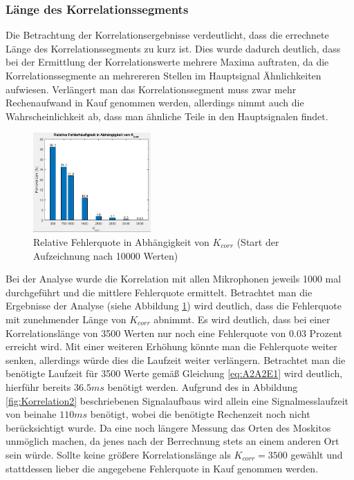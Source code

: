 \subsubsection{Länge des Korrelationssegments}

Die Betrachtung der Korrelationsergebnisse verdeutlicht, dass die errechnete Länge des Korrelationssegments zu kurz ist. Dies wurde dadurch deutlich, dass bei der Ermittlung der Korrelationswerte mehrere Maxima auftraten, da die Korrelationssegmente an mehrereren Stellen im Hauptsignal Ähnlichkeiten aufwiesen. Verlängert man das Korrelationssegment muss zwar mehr Rechenaufwand in Kauf genommen werden, allerdings nimmt auch die Wahrscheinlichkeit ab, dass man ähnliche Teile in den Hauptsignalen findet.\\


\begin{figure}
\centering 
\includegraphics[width=0.4\textwidth]{KorrelationsAnalyse1}
\caption{Relative Fehlerquote in Abhängigkeit von $K_{corr}$  \linebreak(Start der Aufzeichnung nach 10000 Werten)} \label{fig:KorrelationAnalyse1}
\end{figure}

Bei der Analyse wurde die Korrelation mit allen Mikrophonen jeweils 1000 mal durchgeführt und die mittlere Fehlerquote ermittelt. Betrachtet man die Ergebnisse der Analyse (siehe Abbildung \ref{fig:KorrelationAnalyse1}) wird deutlich, dass die Fehlerquote mit zunehmender Länge von $K_{corr}$ abnimmt. Es wird deutlich, dass bei einer Korrelationslänge von 3500 Werten nur noch eine Fehlerquote von $0.03$  Prozent  erreicht wird. Mit einer weiteren Erhöhung könnte man die Fehlerquote weiter senken, allerdings würde dies die Laufzeit weiter verlängern. Betrachtet man die benötigte Laufzeit für 3500 Werte gemäß Gleichung \ref{eq:A2A2E1} wird deutlich, hierführ bereits $36.5ms$ benötigt werden.
Aufgrund des in Abbildung \ref{fig:Korrelation2} beschriebenen Signalaufbaus wird allein eine Signalmesslaufzeit von beinahe $110ms$ benötigt, wobei die benötigte Rechenzeit noch nicht berücksichtigt wurde.
Da eine noch längere Messung das Orten des Moskitos unmöglich machen, da jenes nach der Berrechnung stets an einem anderen Ort sein würde. Sollte keine größere Korrelationslänge als $K_{corr} = 3500$ gewählt  und stattdessen lieber die angegebene  Fehlerquote in Kauf genommen werden.

